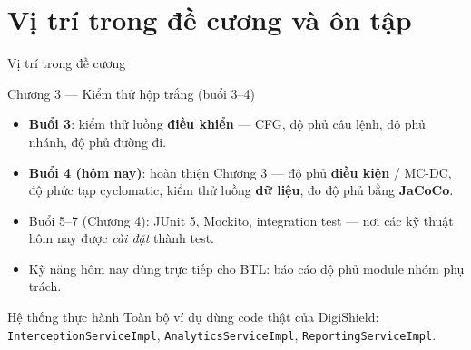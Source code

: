 \documentclass[aspectratio=169,12pt]{beamer}
\begin{document}
\section{Vị trí trong đề cương và ôn tập}

\begin{frame}{Vị trí trong đề cương}
  \begin{block}{Chương 3 --- Kiểm thử hộp trắng (buổi 3--4)}
    \begin{itemize}
      \item \textbf{Buổi 3}: kiểm thử luồng \textbf{điều khiển} --- CFG,
            độ phủ câu lệnh, độ phủ nhánh, độ phủ đường đi.
      \item \textbf{Buổi 4 (hôm nay)}: hoàn thiện Chương 3 ---
            độ phủ \textbf{điều kiện} / MC-DC, độ phức tạp cyclomatic,
            kiểm thử luồng \textbf{dữ liệu}, đo độ phủ bằng \textbf{JaCoCo}.
    \end{itemize}
  \end{block}

  \vspace{0.3em}
  \begin{itemize}
    \item Buổi 5--7 (Chương 4): JUnit 5, Mockito, integration test ---
          nơi các kỹ thuật hôm nay được \textit{cài đặt} thành test.
    \item Kỹ năng hôm nay dùng trực tiếp cho BTL: báo cáo độ phủ
          module nhóm phụ trách.
  \end{itemize}

  \begin{exampleblock}{Hệ thống thực hành}
    \small Toàn bộ ví dụ dùng code thật của DigiShield:
    \texttt{InterceptionServiceImpl}, \texttt{AnalyticsServiceImpl},
    \texttt{ReportingServiceImpl}.
  \end{exampleblock}
\end{frame}
\end{document}
